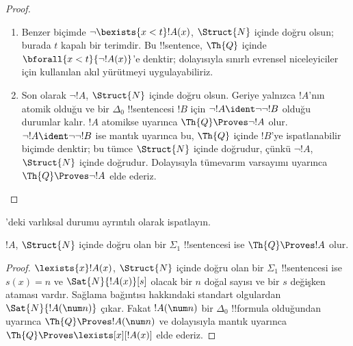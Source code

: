 \begin{proof}
\begin{enumerate}
dolayısıyla sınırlı varlıksal niceleyiciler için kullanılan akıl yürütmeyi
uygulayabiliriz.
%
\item Benzer biçimde $\lnot\bexists{x<t}!A(x)$, $\Struct{N}$ içinde doğru
olsun; burada $t$ kapalı bir terimdir. Bu !!{sentence}, $\Th{Q}$ içinde
$\bforall{x<t}{\lnot !A(x)}$'e denktir; dolayısıyla sınırlı evrensel
niceleyiciler için kullanılan akıl yürütmeyi uygulayabiliriz.
%
\item Son olarak $\lnot !A$, $\Struct{N}$ içinde doğru olsun. Geriye yalnızca
$!A$'nın atomik olduğu ve bir $\Delta_0$ !!{sentence}{}si $!B$ için
$\lnot !A\ident\lnot\lnot !B$ olduğu durumlar kalır. $!A$ atomikse
 uyarınca $\Th{Q} \Proves \lnot !A$ olur.
$\lnot !A\ident\lnot\lnot !B$ ise mantık uyarınca bu, $\Th{Q}$ içinde
$!B$'ye ispatlanabilir biçimde denktir; bu tümce $\Struct{N}$ içinde
doğrudur, çünkü $\lnot !A$, $\Struct{N}$ içinde doğrudur. Dolayısıyla tümevarım varsayımı
uyarınca $\Th{Q} \Proves \lnot !A$ elde ederiz.
\end{enumerate}
\end{proof}

\begin{prob}
'deki varlıksal durumu ayrıntılı olarak
ispatlayın.
\end{prob}

\begin{thm}
$!A$, $\Struct{N}$ içinde doğru olan bir $\Sigma_1$ !!{sentence}{}si ise
$\Th{Q} \Proves !A$ olur.
\end{thm}

\begin{proof}
$\lexists{x}!A(x)$, $\Struct{N}$ içinde doğru olan bir $\Sigma_1$
!!{sentence}{}si ise $s(x)=n$ ve $\Sat{N}{!A(x)}[s]$ olacak bir $n$ doğal
sayısı ve bir $s$ değişken ataması vardır. Sağlama bağıntısı hakkındaki
standart olgulardan $\Sat{N}{!A(\num n)}$ çıkar. Fakat $!A(\num n)$ bir
$\Delta_0$ !!{formula} olduğundan  uyarınca
$\Th{Q} \Proves !A(\num n)$ ve dolayısıyla mantık uyarınca
$\Th{Q} \Proves \lexists[x][!A(x)]$ elde ederiz.
\end{proof}

